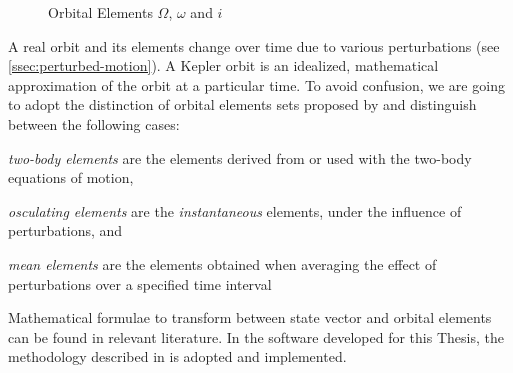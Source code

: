 \begin{figure}
  \centering
  
  \caption{Orbital Elements $\Omega$, $\omega$ and $i$}
  \label{fig:orbital-elements-Ooi}
\end{figure}

A real orbit and its elements change over time due to various perturbations (see 
\autoref{ssec:perturbed-motion}). A Kepler orbit is an idealized, mathematical 
approximation of the orbit at a particular time. To avoid confusion, we are going 
to adopt the distinction of orbital elements sets proposed by \cite{Vallado} and 
distinguish between the following cases:
\begin{description}
  \item \emph{two-body elements} are the elements derived from or used with 
    the two-body equations of motion,
  \item \emph{osculating elements} are the \emph{instantaneous} elements, under 
    the influence of perturbations, and
  \item \emph{mean elements} are the elements obtained when averaging the 
    effect of perturbations over a specified time interval
\end{description}

Mathematical formulae to transform between state vector and orbital elements can 
be found in relevant literature. In the software developed for this Thesis, the 
methodology described in \cite{Montenbruck2000} is adopted and implemented.
